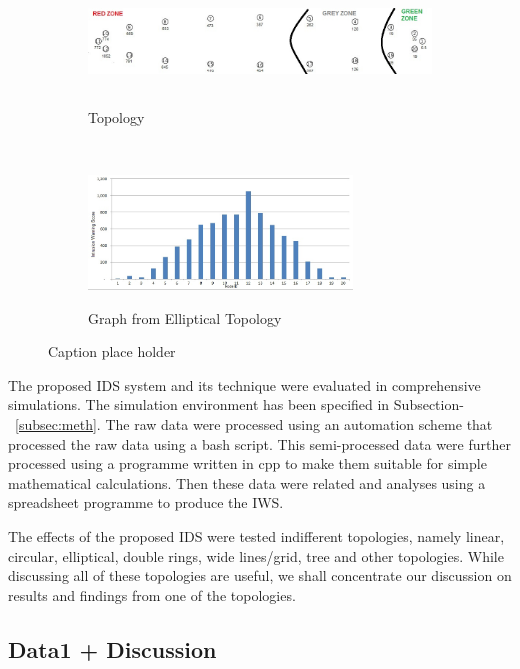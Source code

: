 \documentclass[conference,final]{IEEEtran}
\begin{document}
\begin{figure}[t!]
\label{fig:ellip}
    \centering
    \begin{subfigure}[b]{0.5\textwidth}
        \centering
        \includegraphics[height=1in, width=4in]{Elliptical}
        \label{subfig:elliptopo}
        \caption{Topology}
    \end{subfigure}%
    ~ 
    \begin{subfigure}[b]{0.5\textwidth}
        \centering
        \includegraphics[height=1.2in]{Elliptical_column}
        \label{subfig:ellipgraph}
        \caption{Graph from Elliptical Topology}
    \end{subfigure}
    \caption{Caption place holder}
\end{figure}

The proposed IDS system and its technique were evaluated in comprehensive simulations.
The simulation environment has been specified in Subsection-~\ref{subsec:meth}.
The raw data were processed using an automation scheme that processed the raw data using a bash script.
This semi-processed data were further processed using a programme written in cpp to make them suitable for simple mathematical calculations.
Then these data were related and  analyses using a spreadsheet programme to produce the IWS.

The effects of the proposed IDS were tested indifferent topologies, namely linear, circular, elliptical, double rings, wide lines/grid, tree and other topologies.
While discussing all of these topologies are useful, we shall concentrate our discussion on results and findings from one of the topologies.

\subsection{Data1 + Discussion}
\end{document}
